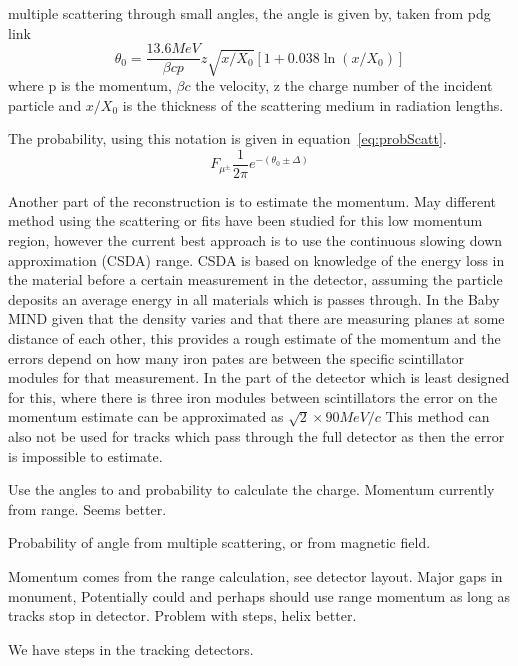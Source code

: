 
multiple scattering  through small angles, the angle is given by, taken from pdg link
\begin{equation}
\theta_0 = \frac{13.6 MeV}{\beta cp} z \sqrt{x/X_0}[1+0.038\ln(x/X_0)]
\end{equation}
where p is the momentum, $\beta c$ the velocity, z the charge number of the incident particle and $x/X_0$ is the thickness of the scattering medium in radiation lengths.

The probability, using this notation is given in equation~\ref{eq:probScatt}.
\begin{equation}
F_{\mu^\pm} \frac{1}{2\pi} e ^ {-( \theta_0 \pm \Delta)}
\label{eq:probScatt}
\end{equation}

Another part of the reconstruction is to estimate the momentum. May different method using the scattering or fits have been studied for this low momentum region, however the current best approach is to use the continuous slowing down approximation (CSDA) range.
CSDA is based on knowledge of the energy loss in the material before a certain measurement in the detector, assuming the particle deposits an average energy in all materials which is passes through. In the Baby MIND given that the density varies and that there are measuring planes at some distance of each other, this provides a rough estimate of the momentum and the errors depend on how many iron pates are between the specific scintillator modules for that measurement. In the part of the detector which is least designed for this, where there is three iron modules between scintillators the error on the momentum estimate can be approximated as $\sqrt{2} \times 90 MeV/c$ This method can also not be used for tracks which pass through the full detector as then the error is impossible to estimate.


Use the angles to and probability to calculate the charge. Momentum currently from range. Seems better.

Probability of angle from multiple scattering, or from magnetic field. 

Momentum comes from the range calculation, see detector layout. Major gaps in monument,  Potentially could and perhaps should use range momentum as long as tracks stop in detector. Problem with steps, helix better.

We have steps in the tracking detectors.

